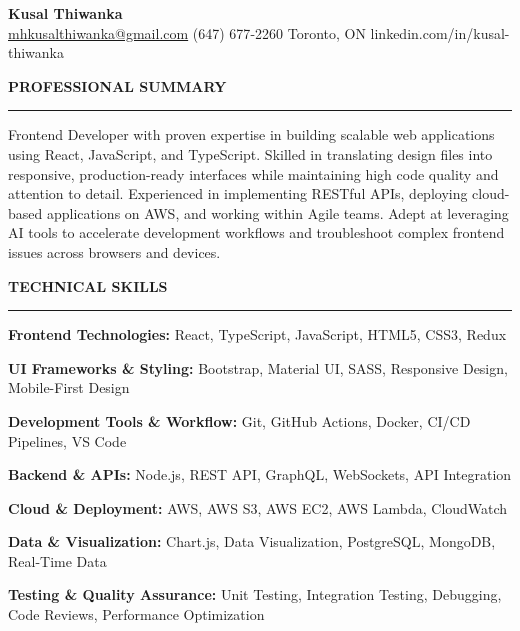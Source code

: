 \documentclass[10pt,letterpaper]{article}
\begin{document}
\begin{center}
{\LARGE\textbf{Kusal Thiwanka}}\\[3pt]
\href{mailto:mhkusalthiwanka@gmail.com}{mhkusalthiwanka@gmail.com}\hspace{2em}%
(647) 677{-}2260\hspace{2em}%
Toronto, ON\hspace{2em}
linkedin.com/in/kusal-thiwanka
\end{center}

\vspace{6pt}

\textbf{PROFESSIONAL SUMMARY}\\[-8pt]
\noindent\rule{\textwidth}{1pt}

\vspace{-2pt}

Frontend Developer with proven expertise in building scalable web applications using React, JavaScript, and TypeScript. Skilled in translating design files into responsive, production-ready interfaces while maintaining high code quality and attention to detail. Experienced in implementing RESTful APIs, deploying cloud-based applications on AWS, and working within Agile teams. Adept at leveraging AI tools to accelerate development workflows and troubleshoot complex frontend issues across browsers and devices.

\vspace{8pt}

\textbf{TECHNICAL SKILLS}\\[-8pt]
\noindent\rule{\textwidth}{1pt}

\vspace{-2pt}

\textbf{Frontend Technologies:} React, TypeScript, JavaScript, HTML5, CSS3, Redux

\textbf{UI Frameworks \& Styling:} Bootstrap, Material UI, SASS, Responsive Design, Mobile-First Design

\textbf{Development Tools \& Workflow:} Git, GitHub Actions, Docker, CI/CD Pipelines, VS Code

\textbf{Backend \& APIs:} Node.js, REST API, GraphQL, WebSockets, API Integration

\textbf{Cloud \& Deployment:} AWS, AWS S3, AWS EC2, AWS Lambda, CloudWatch

\textbf{Data \& Visualization:} Chart.js, Data Visualization, PostgreSQL, MongoDB, Real-Time Data

\textbf{Testing \& Quality Assurance:} Unit Testing, Integration Testing, Debugging, Code Reviews, Performance Optimization
\end{document}
